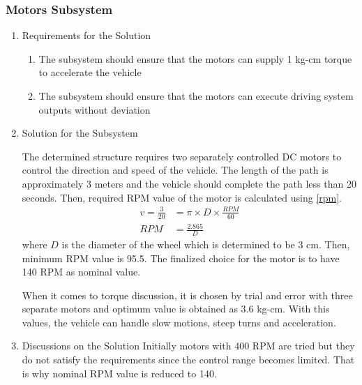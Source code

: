 \documentclass[a4paper,12pt]{article}
\begin{document}
	\subsubsection{Motors Subsystem}

		\begin{enumerate}
			\item {Requirements for the Solution}
			
			\begin{enumerate}
				\item The subsystem should ensure that the motors can supply 1 kg-cm torque to accelerate the vehicle 
				\item The subsystem should ensure that the motors can execute driving system outputs without deviation
			\end{enumerate} 

		\item {Solution for the Subsystem}

		The determined structure requires two separately controlled DC motors to control the direction and speed of the vehicle. The length of the path is approximately 3 meters and the vehicle should complete the path less than 20 seconds. Then, required RPM value of the motor is calculated using \eqref{rpm}. 
		\begin{equation}\label{rpm}
		\begin{split}
		v=\frac{3}{20}&=\pi\times D\times\frac{RPM}{60}\\
		RPM&=\frac{2.865}{D}
		\end{split}
		\end{equation}
		where $D$ is the diameter of the wheel which is determined to be 3 cm. Then, minimum RPM value is 95.5. The finalized choice for the motor is to have 140 RPM as nominal value.  
		
		When it comes to torque discussion, it is chosen by trial and error with three separate motors and optimum value is obtained as 3.6 kg-cm. With this values, the vehicle can handle slow motions, steep turns and acceleration.  
	
		\item {Discussions on the Solution}
	 Initially motors with 400 RPM are tried but they do not satisfy the requirements since the control range becomes limited. That is why nominal RPM value is reduced to 140.


	\end{enumerate}	
\end{document}
